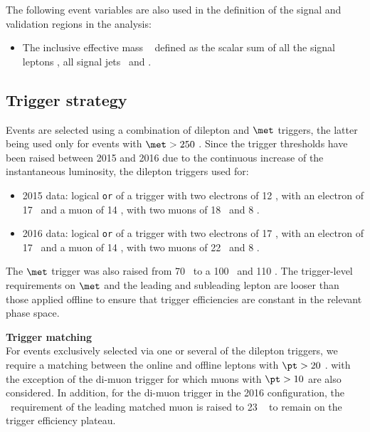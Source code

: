 The following event variables are also used in the definition of the signal and validation regions in the analysis:
\begin{itemize}
\item The inclusive effective mass \meff~ defined as the scalar sum of
  all the signal leptons \pt , all signal jets \pt\ and \met. 
\end{itemize}

\subsection{Trigger strategy}
\label{subsec:sec.strategy.sel.selection_trigger}
  
Events are selected using a combination of dilepton and $\met$ triggers, the latter being used only for events with $\met>250$ \GeV. 
Since the trigger thresholds have been raised between 2015 and 2016 due to the 
continuous increase of the instantaneous luminosity, 
the dilepton triggers used for: 
\begin{itemize}
\item 2015 data:
logical \texttt{or} of a trigger with two electrons of 12 \GeV, 
with an electron of 17 \GeV~and a muon of 14 \GeV,
with two muons of 18 \GeV~and 8 \GeV. 
\item 2016 data:
logical \texttt{or} of a trigger with two electrons of 17 \GeV, 
with an electron of 17 \GeV~and a muon of 14 \GeV,
with two muons of 22 \GeV~and 8 \GeV. 
\end{itemize}
The $\met$ trigger was also raised from 70 \GeV~to a 100 \GeV~and 110 \GeV.
The trigger-level requirements on $\met$ and the leading and subleading lepton \pt are looser than those applied offline 
to ensure that trigger efficiencies are constant in the relevant phase space.


\par{\bfseries Trigger matching\\}
For events exclusively selected via one or several of the dilepton triggers, 
we require a matching between the online and offline leptons with $\pt>20$ \GeV.
with the exception of the di-muon trigger for which muons with $\pt>10$ \GeV 
are also considered.
In addition, for the di-muon trigger in the 2016 configuration, 
the \pt\ requirement of the leading matched muon is raised to 23 \GeV~
to remain on the trigger efficiency plateau. 

